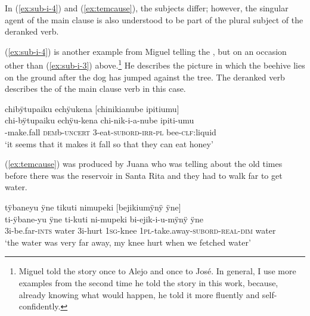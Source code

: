 
In (\ref{ex:sub-i-4}) and (\ref{ex:temcause}), the subjects differ; however, the singular agent of the main clause is also understood to be part of the plural subject of the deranked verb.

(\ref{ex:sub-i-4}) is another example from Miguel telling the , but on an occasion other than (\ref{ex:sub-i-3}) above.\footnote{Miguel told the story once to Alejo and once to José. In general, I use more examples from the second time he told the story in this work, because, already knowing what would happen, he told it more fluently and self-confidently.} He describes the picture in which the beehive lies on the ground after the dog has jumped against the tree. The deranked verb describes the  of the main clause verb in this case.

\ea\label{ex:sub-i-4}
\begingl 
\glpreamble chibÿtupaiku echÿukena \textup{[}chinikianube ipitiumu\textup{]}\\
\gla chi-bÿtupaiku echÿu-kena chi-nik-i-a-nube ipiti-umu\\ 
-make.fall \textsc{dem}b-\textsc{uncert} 3-eat-\textsc{subord}-\textsc{irr}-\textsc{pl} bee-\textsc{clf}:liquid\\ 
\glft ‘it seems that it makes it fall so that they can eat honey’
\trailingcitation{[mtx-a110906l.093]}
\xe

(\ref{ex:temcause}) was produced by Juana who was telling about the old times before there was the reservoir in Santa Rita and they had to walk far to get water.

\ea\label{ex:temcause}
\begingl
\glpreamble tÿbaneyu ÿne tikuti nimupeki \textup{[}bejikiumÿnÿ ÿne\textup{]}\\
\gla ti-ÿbane-yu ÿne ti-kuti ni-mupeki bi-ejik-i-u-mÿnÿ ÿne\\
\glb 3i-be.far-\textsc{ints} water 3i-hurt 1\textsc{sg}-knee 1\textsc{pl}-take.away-\textsc{subord}-\textsc{real}-\textsc{dim} water\\
\glft ‘the water was very far away, my knee hurt when we fetched water’
\endgl
\trailingcitation{[jxx-p120515l-2.005]}
\xe

